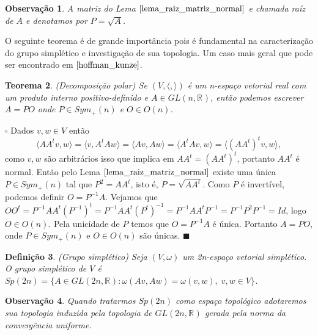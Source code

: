 \documentclass[12pt]{book}
\newtheorem{teorema}{Teorema}[section]
\newtheorem{definicao}[teorema]{Definição}
\newtheorem{observacao}[teorema]{Observação}
\newenvironment{prova}[1]{$\square$ #1}{\hfill$\blacksquare$}
\newcommand{\generalgroup}[2]{GL(#1, #2)}
\newcommand{\generalgroupreal}[1]{\generalgroup{#1}{\real{}}}
\newcommand{\gruposimpletico}[1]{Sp(#1)}
\newcommand{\matrizortogonal}[1]{O(#1)}
\newcommand{\matrizsimetricapositiva}[1]{Sym_{+}(#1)}
\newcommand{\produtointerno}[2]{\langle #1, #2 \rangle}
\newcommand{\real}[1]{\mathbb{R}^{#1}}
\begin{document}
	\begin{observacao}\label{observacao_raiz_matriz_normal}
		A matriz do Lema $\ref{lema_raiz_matriz_normal}$ e chamada raíz de $A$ e denotamos por $P=\sqrt{A}$.
	\end{observacao}
	
	O seguinte teorema é de grande importância pois é fundamental na caracterização do grupo simplético e investigação de sua topologia. Um caso mais geral que pode ser encontrado em $\cite{hoffman_kunze}$.
	
	\begin{teorema}\label{teorema_decomposicao_polar}
		(Decomposição polar) Se $(V, \produtointerno{}{})$ é um n-espaço vetorial real com um produto interno positivo-definido e $A \in \generalgroupreal{n}$, então podemos escrever $A=PO$ onde $P \in  \matrizsimetricapositiva{n}$ e $O \in \matrizortogonal{n}$.
	\end{teorema}
	\begin{prova}
		Dados $v,w \in V$ então 
		$$
		\produtointerno{AA^{t}v}{w}=\produtointerno{v}{A^{t}Aw}=\produtointerno{Av}{Aw}=\produtointerno{A^{t}Av}{w}=\produtointerno{(AA^{t})^{t} v}{w},
		$$
		como $v,w $ são arbitrários isso que implica em $AA^{t}=(AA^{t})^{t}$, portanto $AA^{t}$ é normal. Então pelo Lema $\ref{lema_raiz_matriz_normal}$ existe uma única $P \in \matrizsimetricapositiva{n}$ tal que $P^{2} = AA^{t}$, isto é, $P = \sqrt{AA^{t}}$. Como $P$ é invertível, podemos definir $O = P^{-1}A$. Vejamos que $OO^{t} = P^{-1}AA^{t}(P^{-1})^{t} = P^{-1}AA^{t}(P^{t})^{-1} = P^{-1}AA^{t}P^{-1} = P^{-1}P^{2}P^{-1} = Id$, logo $O \in \matrizortogonal{n}$. Pela unicidade de $P$ temos que $O=P^{-1}A$ é única. Portanto $A=PO$, onde $P \in \matrizsimetricapositiva{n}$ e $O \in \matrizortogonal{n}$ são únicas.
	\end{prova}
	
	\begin{definicao}
		(Grupo simplético) Seja $(V,\omega)$ um 2n-espaço vetorial simplético. O grupo simplético de $V$ é $\gruposimpletico{2n} = \{A \in \generalgroupreal{2n}: \omega(Av, Aw) = \omega(v, w), \; v,w \in V \}$.
	\end{definicao}
	
	\begin{observacao}
		Quando tratarmos $\gruposimpletico{2n}$ como espaço topológico adotaremos sua topologia induzida pela topologia de $\generalgroupreal{2n}$ gerada pela norma da convergência uniforme.
	\end{observacao}
	
\end{document}
